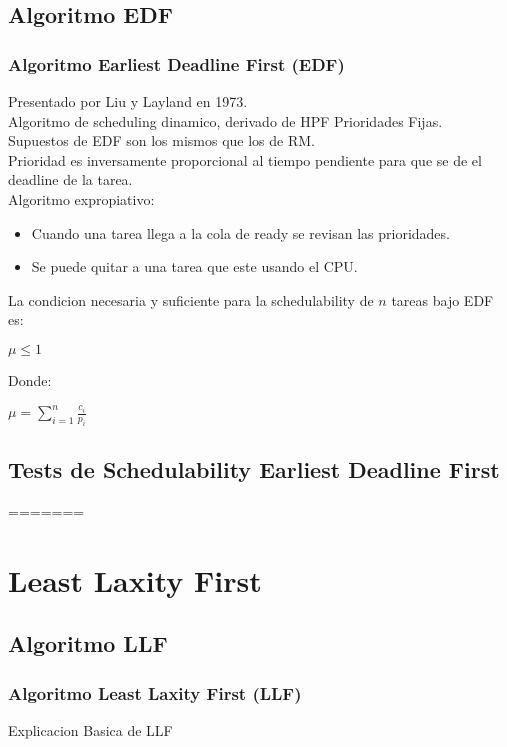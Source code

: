 \documentclass[xcolor=table]{beamer}
\begin{document}
\begin{frame}
\subsection{Algoritmo EDF}

\begin{frame} 
\frametitle{Algoritmo Earliest Deadline First (EDF)} 

Presentado por Liu y Layland en 1973. \\
Algoritmo de scheduling dinamico, derivado de HPF Prioridades Fijas. \\
Supuestos de EDF son los mismos que los de RM. \\
Prioridad es inversamente proporcional al tiempo pendiente para que se de el deadline de la tarea. \\
Algoritmo expropiativo:
\begin{itemize}
\item Cuando una tarea llega a la cola de ready se revisan las prioridades.
\item Se puede quitar a una tarea que este usando el CPU.
\end{itemize} 


La condicion necesaria y suficiente para la schedulability de $n$ tareas bajo EDF es:
\begin{center}
$\mu \leq 1$
\end{center}

Donde:
\begin{center}
$\mu = \sum_{i=1}^{n}\frac{c_i}{p_i}$
\end{center}

\end{frame}

\subsection{Tests de Schedulability  Earliest Deadline First } 
=======
\section{Least Laxity First}

\subsection{Algoritmo LLF}

\begin{frame} 
\frametitle{Algoritmo Least Laxity First (LLF)} 
Explicacion Basica de LLF \\
\end{frame}


\end{frame}
\end{document}
